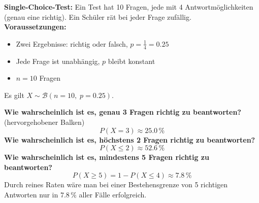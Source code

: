 \begin{bsp}
\end{bsp}

\begin{bsp}
\textbf{Single-Choice-Test:} Ein Test hat 10 Fragen, jede mit 4 Antwortmöglichkeiten (genau eine richtig). Ein Schüler rät bei jeder Frage zufällig. \\[4pt]
\textbf{Voraussetzungen:}
\begin{itemize}
    \item Zwei Ergebnisse: richtig oder falsch, \quad $p = \tfrac{1}{4} = 0.25$
    \item Jede Frage ist unabhängig, $p$ bleibt konstant
    \item $n = 10$ Fragen
\end{itemize}
Es gilt $X \sim \mathcal{B}(n=10,\; p=0.25)$.
\begin{center}
\end{center}
\textbf{Wie wahrscheinlich ist es, genau 3 Fragen richtig zu beantworten?} (hervorgehobener Balken)
\[
    P(X = 3) \approx 25.0\,\%
\]
\textbf{Wie wahrscheinlich ist es, höchstens 2 Fragen richtig zu beantworten?}
\[
    P(X \leq 2) \approx 52.6\,\%
\]
\textbf{Wie wahrscheinlich ist es, mindestens 5 Fragen richtig zu beantworten?}
\[
    P(X \geq 5) = 1 - P(X \leq 4) \approx 7.8\,\%
\]
Durch reines Raten wäre man bei einer Bestehensgrenze von 5 richtigen Antworten nur in $7.8\,\%$ aller Fälle erfolgreich.
\end{bsp}

\pagebreak
